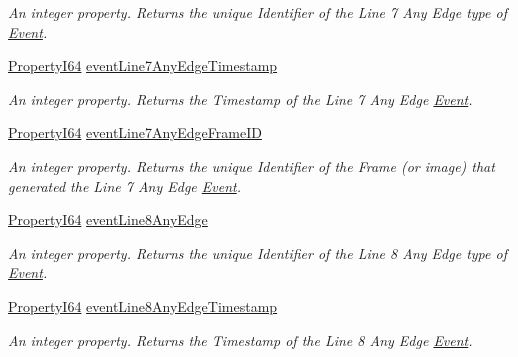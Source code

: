 \begin{DoxyCompactItemize}
\begin{DoxyCompactList}\small\item\em An integer property. Returns the unique Identifier of the Line 7 Any Edge type of \hyperlink{classmv_i_m_p_a_c_t_1_1acquire_1_1_event}{Event}. \end{DoxyCompactList}\item 
\hyperlink{group___common_interface_ga81749b2696755513663492664a18a893}{Property\+I64} \hyperlink{classmv_i_m_p_a_c_t_1_1acquire_1_1_gen_i_cam_1_1_event_control_a331885b23e26f654ac61fe2c0db77061}{event\+Line7\+Any\+Edge\+Timestamp}
\begin{DoxyCompactList}\small\item\em An integer property. Returns the Timestamp of the Line 7 Any Edge \hyperlink{classmv_i_m_p_a_c_t_1_1acquire_1_1_event}{Event}. \end{DoxyCompactList}\item 
\hyperlink{group___common_interface_ga81749b2696755513663492664a18a893}{Property\+I64} \hyperlink{classmv_i_m_p_a_c_t_1_1acquire_1_1_gen_i_cam_1_1_event_control_a79f57dcc3af6ee6132b6bd3a9e9b29a9}{event\+Line7\+Any\+Edge\+Frame\+I\+D}
\begin{DoxyCompactList}\small\item\em An integer property. Returns the unique Identifier of the Frame (or image) that generated the Line 7 Any Edge \hyperlink{classmv_i_m_p_a_c_t_1_1acquire_1_1_event}{Event}. \end{DoxyCompactList}\item 
\hyperlink{group___common_interface_ga81749b2696755513663492664a18a893}{Property\+I64} \hyperlink{classmv_i_m_p_a_c_t_1_1acquire_1_1_gen_i_cam_1_1_event_control_a4409ff726b719aef9f6ad4bb4cdab03b}{event\+Line8\+Any\+Edge}
\begin{DoxyCompactList}\small\item\em An integer property. Returns the unique Identifier of the Line 8 Any Edge type of \hyperlink{classmv_i_m_p_a_c_t_1_1acquire_1_1_event}{Event}. \end{DoxyCompactList}\item 
\hyperlink{group___common_interface_ga81749b2696755513663492664a18a893}{Property\+I64} \hyperlink{classmv_i_m_p_a_c_t_1_1acquire_1_1_gen_i_cam_1_1_event_control_ac9dc59af14b4168a9d2ba02bf65ae8c4}{event\+Line8\+Any\+Edge\+Timestamp}
\begin{DoxyCompactList}\small\item\em An integer property. Returns the Timestamp of the Line 8 Any Edge \hyperlink{classmv_i_m_p_a_c_t_1_1acquire_1_1_event}{Event}. \end{DoxyCompactList}\item 

\end{DoxyCompactItemize}
